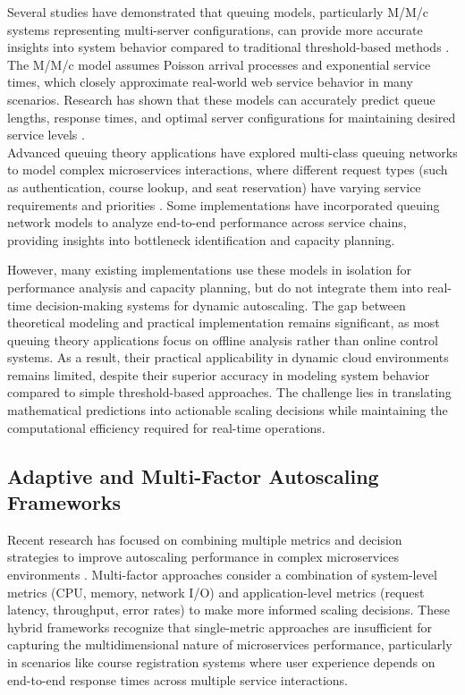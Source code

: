 Several studies have demonstrated that queuing models, particularly M/M/c systems representing multi-server configurations, can provide more accurate insights into system behavior compared to traditional threshold-based methods \cite{khaleq2021}. The M/M/c model assumes Poisson arrival processes and exponential service times, which closely approximate real-world web service behavior in many scenarios. Research has shown that these models can accurately predict queue lengths, response times, and optimal server configurations for maintaining desired service levels \cite{fourati2021}.\\

Advanced queuing theory applications have explored multi-class queuing networks to model complex microservices interactions, where different request types (such as authentication, course lookup, and seat reservation) have varying service requirements and priorities \cite{wang2024}. Some implementations have incorporated queuing network models to analyze end-to-end performance across service chains, providing insights into bottleneck identification and capacity planning.

However, many existing implementations use these models in isolation for performance analysis and capacity planning, but do not integrate them into real-time decision-making systems for dynamic autoscaling. The gap between theoretical modeling and practical implementation remains significant, as most queuing theory applications focus on offline analysis rather than online control systems. As a result, their practical applicability in dynamic cloud environments remains limited, despite their superior accuracy in modeling system behavior compared to simple threshold-based approaches. The challenge lies in translating mathematical predictions into actionable scaling decisions while maintaining the computational efficiency required for real-time operations.

\subsection{Adaptive and Multi-Factor Autoscaling Frameworks}

Recent research has focused on combining multiple metrics and decision strategies to improve autoscaling performance in complex microservices environments \cite{arulmary2026}. Multi-factor approaches consider a combination of system-level metrics (CPU, memory, network I/O) and application-level metrics (request latency, throughput, error rates) to make more informed scaling decisions. These hybrid frameworks recognize that single-metric approaches are insufficient for capturing the multidimensional nature of microservices performance, particularly in scenarios like course registration systems where user experience depends on end-to-end response times across multiple service interactions.

